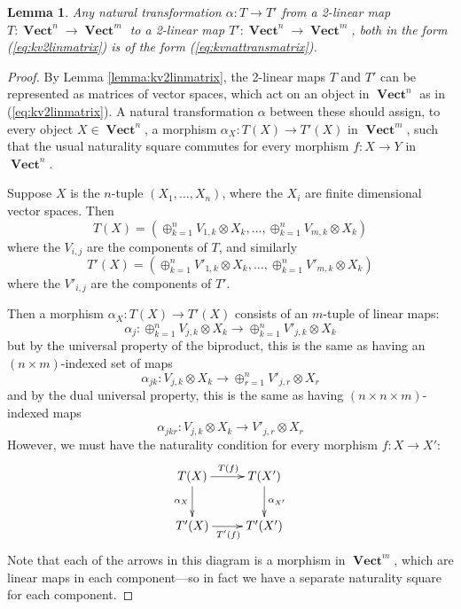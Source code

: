 \documentclass[10pt]{amsart}
\numberwithin{theorem}{subsection}
\newtheorem{lemma}[theorem]{Lemma}
\newcommand{\ra}{\mathop{\rightarrow}}
\newcommand{\opname}[1]{\operatorname{#1}}
\newcommand{\catname}[1]{\boldsymbol{\opname{{#1}}}}
\newcommand{\V}{\catname{Vect}}
\begin{document}
\begin{lemma}\label{lemma:kvnattransmatrix}Any natural transformation
$\alpha : T \ra T'$ from a 2-linear map $T : \V^n \ra \V^m$ to a
2-linear map $T' : \V^n \ra \V^m$, both in the form
(\ref{eq:kv2linmatrix}) is of the form (\ref{eq:kvnattransmatrix}).
\end{lemma}
\begin{proof}
By Lemma \ref{lemma:kv2linmatrix}, the 2-linear maps $T$ and $T'$ can
be represented as matrices of vector spaces, which act on an object
in $\V^n$ as in (\ref{eq:kv2linmatrix}).  A natural transformation
$\alpha$ between these should assign, to every object $X \in \V^n$, a
morphism $\alpha_X : T(X) \ra T'(X) $ in $\V^m$, such that the usual
naturality square commutes for every morphism $f : X \ra Y$ in $\V^n$.

Suppose $X$ is the $n$-tuple $(X_1, \dots , X_n)$,
where the $X_i$ are finite dimensional vector spaces.  Then
\begin{equation}\label{eq:TX}
T(X) = (\oplus_{k=1}^{n} V_{1,k} \otimes X_k, \dots,\oplus_{k=1}^{n} V_{m,k} \otimes X_k )
\end{equation}
where the $V_{i,j}$ are the components of $T$, and similarly
\begin{equation}
T'(X) = (\oplus_{k=1}^{n} V'_{1,k} \otimes X_k, \dots,\oplus_{k=1}^{n} V'_{m,k} \otimes X_k )\end{equation}
where the $V'_{i,j}$ are the components of $T'$.

Then a morphism $\alpha_X : T(X) \ra T'(X)$ consists of an $m$-tuple
of linear maps:
\begin{equation}
\alpha_j : \oplus_{k=1}^{n} V_{j,k} \otimes X_k \ra \oplus_{k=1}^{n} V'_{j,k} \otimes X_k
\end{equation}
but by the universal property of the biproduct, this is the same as
having an $(n \times m)$-indexed set of maps
\begin{equation}
\alpha_{jk} : V_{j,k} \otimes X_k \ra \oplus_{r=1}^{n} V'_{j,r} \otimes X_r
\end{equation}
and by the dual universal property, this is the same as having $(n
\times n \times m)$-indexed maps
\begin{equation}
\alpha_{jkr} : V_{j,k} \otimes X_k \ra V'_{j,r} \otimes X_r
\end{equation}
However, we must have the naturality condition for every morphism
$f:X \ra X'$:
\begin{equation}
\xymatrix{
  T(X) \ar[d]_{\alpha_{X}} \ar[r]^{T(f)} & T(X') \ar[d]^{\alpha_{X'}} \\
  T'(X) \ar[r]_{T'(f)} & T'(X')\\ 
}
\end{equation}
Note that each of the arrows in this diagram is a morphism in $\V^m$,
which are linear maps in each component---so in fact we have a
separate naturality square for each component.


\end{proof}
\end{document}
